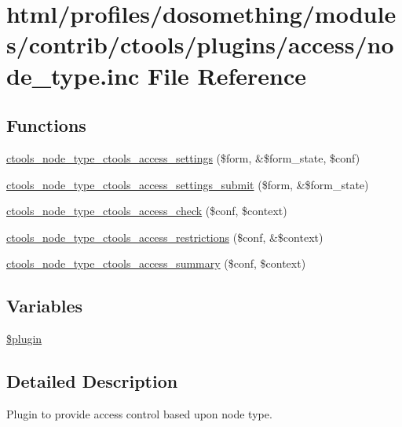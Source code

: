 \hypertarget{node__type_8inc}{
\section{html/profiles/dosomething/modules/contrib/ctools/plugins/access/node\_\-type.inc File Reference}
\label{node__type_8inc}
}
\subsection*{Functions}
\begin{DoxyCompactItemize}
\item 
\hyperlink{node__type_8inc_a6426607ca26ccc9d6bacd1ef24ee5f56}{ctools\_\-node\_\-type\_\-ctools\_\-access\_\-settings} (\$form, \&\$form\_\-state, \$conf)
\item 
\hyperlink{node__type_8inc_ad4fb4701b51cdb448f1f41e6a2b07b33}{ctools\_\-node\_\-type\_\-ctools\_\-access\_\-settings\_\-submit} (\$form, \&\$form\_\-state)
\item 
\hyperlink{node__type_8inc_ae4798a5c46446fa407ec12dba2007588}{ctools\_\-node\_\-type\_\-ctools\_\-access\_\-check} (\$conf, \$context)
\item 
\hyperlink{node__type_8inc_ac901e4aef52cbbfd1f328da6a5066585}{ctools\_\-node\_\-type\_\-ctools\_\-access\_\-restrictions} (\$conf, \&\$context)
\item 
\hyperlink{node__type_8inc_aac38c594ff33c15c3d5fa6ee686d7d1e}{ctools\_\-node\_\-type\_\-ctools\_\-access\_\-summary} (\$conf, \$context)
\end{DoxyCompactItemize}
\subsection*{Variables}
\begin{DoxyCompactItemize}
\item 
\hyperlink{node__type_8inc_ada8a7130088351710bb02ed622d6bf65}{\$plugin}
\end{DoxyCompactItemize}


\subsection{Detailed Description}
Plugin to provide access control based upon node type. 

